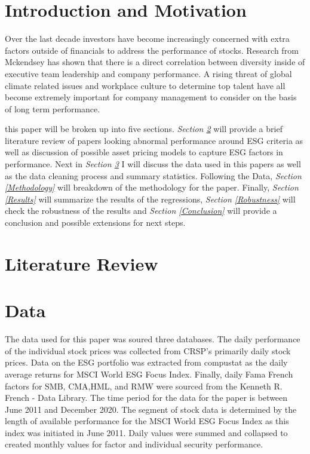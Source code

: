 \documentclass[12pt,oneside,reqno]{amsart}
\begin{document}
\section{Introduction and Motivation}
Over the last decade investors have become increasingly concerned with extra factors outside of financials to address the performance of stocks. Research from Mckendsey has shown that there is a direct correlation between diversity inside of executive team leadership and company performance. A rising threat of global climate related issues and workplace culture to determine top talent have all become extremely important for company management to consider on the basis of long term performance.  


this paper will be broken up into five  sections. \textit{Section \ref{Literature}} will provide a  brief literature review of papers looking abnormal performance around ESG criteria as well as discussion of possible asset pricing models to capture ESG factors in performance. Next in  \textit{ Section \ref{Data}}  I will discuss the data used in this papers as well as the data cleaning process and summary statistics. Following the Data, \textit{Section \ref{Methodology}} will breakdown of the methodology for the paper. Finally, \textit{Section \ref{Results}}  will summarize the results of the regressions, \textit{Section \ref{Robustness}} will check the robustness of the results and \textit{Section \ref{Conclusion}} will provide a conclusion and possible extensions for next steps. 

\section{Literature Review}
\label{Literature}

\section{Data}
\label{Data}
The data used for this paper was soured three databases. The daily performance of the individual stock prices was collected from CRSP's primarily daily stock prices. Data on the ESG portfolio was extracted from compustat as the daily average returns for MSCI World ESG Focus Index. Finally, daily Fama French factors for SMB, CMA,HML, and RMW were sourced from the Kenneth R. French - Data Library.  The time period for the data for the paper is between June 2011 and December 2020. The segment of stock data is determined by the length of available performance for the MSCI World ESG Focus Index as this index was initiated in June 2011. Daily values were summed and collapsed to created monthly values for factor and individual security performance. 
\end{document}
